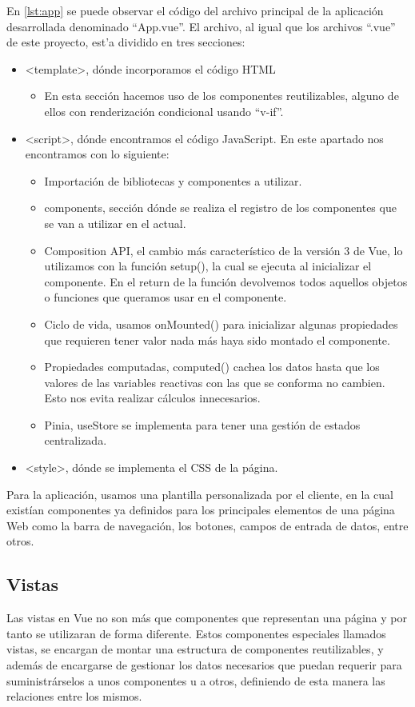 En \ref{lst:app} se puede observar el código del archivo principal de la aplicación desarrollada denominado ``App.vue''. El archivo, al igual que los archivos ``.vue'' de este proyecto, est'a dividido en tres secciones:
\begin{itemize}
\item <template>, dónde incorporamos el código HTML
\begin{itemize}
\item En esta sección hacemos uso de los componentes reutilizables, alguno de ellos con renderización condicional usando ``v-if''.
\end{itemize}
\item <script>, dónde encontramos el código JavaScript. En este apartado nos encontramos con lo siguiente:
\begin{itemize}
\item Importación de bibliotecas y componentes a utilizar.
\item components, sección dónde se realiza el registro de los componentes que se van a utilizar en el actual.
\item Composition API, el cambio más característico de la versión 3 de Vue, lo utilizamos con la función setup(), la cual se ejecuta al inicializar el componente. En el return de la función devolvemos todos aquellos objetos o funciones que queramos usar en el componente.
\item Ciclo de vida, usamos onMounted() para inicializar algunas propiedades que requieren tener valor nada más haya sido montado el componente.
\item Propiedades computadas, computed() cachea los datos hasta que los valores de las variables reactivas con las que se conforma no cambien. Esto nos evita realizar cálculos innecesarios.
\item Pinia, useStore se implementa para tener una gestión de estados centralizada.
\end{itemize}
\item <style>, dónde se implementa el CSS de la página.
\end{itemize}

Para la aplicación, usamos una plantilla personalizada por el cliente, en la cual existían componentes ya definidos para los principales elementos de una página Web como la barra de navegación, los botones, campos de entrada de datos, entre otros.

\subsection{Vistas}
Las vistas en Vue no son más que componentes que representan una página y por tanto se utilizaran de forma diferente. Estos componentes especiales llamados vistas, se encargan de montar una estructura de componentes reutilizables, y además de encargarse de gestionar los datos necesarios que puedan requerir para suministrárselos a unos componentes u a otros, definiendo de esta manera las relaciones entre los mismos.

